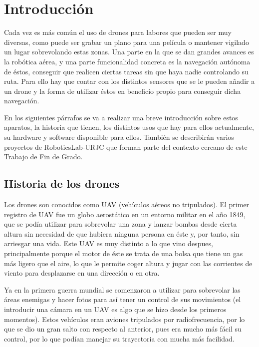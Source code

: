 \chapter{Introducci\'on}\label{cap.introduccion}
\hspace{1 cm}Cada vez es m\'as com\'un el uso de drones para labores que pueden ser muy diversas, como puede ser grabar un plano para una pel\'icula o mantener vigilado un lugar sobrevolando estas zonas. Una parte en la que se dan grandes avances es la rob\'otica a\'erea, y una parte funcionalidad concreta es la navegaci\'on aut\'onoma de \'estos, conseguir que realicen ciertas tareas sin que haya nadie controlando su ruta. Para ello hay que contar con los distintos sensores que se le pueden añadir a un drone y la forma de utilizar \'estos en beneficio propio para conseguir dicha navegaci\'on.

\hspace{1cm} En los siguientes p\'arrafos se va a realizar una breve introducci\'on sobre estos aparatos, la historia que tienen, los distintos usos que hay para ellos actualmente, su hardware y software disponible para ellos. Tambi\'en se describir\'an varios proyectos de RoboticsLab-URJC que forman parte del contexto cercano de este Trabajo de Fin de Grado.

\section{Historia de los drones}

\hspace{1cm} Los drones son conocidos como UAV (veh\'iculos a\'ereos no tripulados). El primer registro de UAV fue un globo aerost\'atico en un entorno militar en el año 1849, que se pod\'ia utilizar para sobrevolar una zona y lanzar bombas desde cierta altura sin necesidad de que hubiera ninguna persona en \'este y, por tanto, sin arriesgar una vida. Este UAV es muy distinto a lo que vino despues, principalmente porque el motor de \'este se trata de una bolsa que tiene un gas m\'as ligero que el aire, lo que le permite coger altura y jugar con las corrientes de viento para desplazarse en una direcci\'on o en otra.

\hspace{1 cm} Ya en la primera guerra mundial se comenzaron a utilizar para sobrevolar las \'areas enemigas y hacer fotos para as\'i tener un control de sus movimientos (el introducir una c\'amara en un UAV es algo que se hizo desde los primeros momentos). Estos veh\'iculos eran aviones tripulados por radiofrecuencia, por lo que se dio un gran salto con respecto al anterior, pues era mucho m\'as f\'acil su control, por lo que pod\'ian manejar su trayectoria con mucha m\'as facilidad. 

